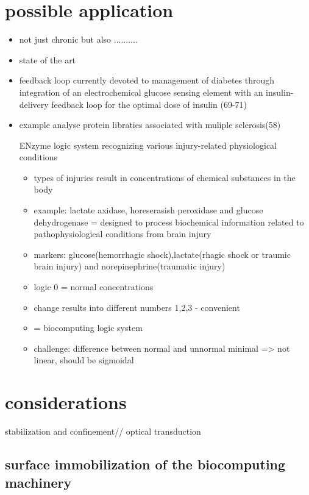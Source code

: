 \documentclass[runningheads]{llncs}
\begin{document}
\section{possible application}
	\begin{itemize}
		\item not just chronic but also ..........
		\item state of the art
		\item feedback loop currently devoted to management of diabetes through integration of an electrochemical glucose sensing element with an insulin-delivery feedback loop for the optimal dose of insulin (69-71)
		\item example analyse protein libraties associated with muliple sclerosis(58)
		
		ENzyme logic system recognizing various injury-related physiological conditions
		\begin{itemize}
			\item types of injuries result in concentrations of chemical substances in the body
			
			\item example: lactate axidase, horeserasish peroxidase and glucose dehydrogenase = designed to process biochemical information related to pathophysiological conditions from brain injury
			\item markers: glucose(hemorrhagic shock),lactate(rhagic shock or traumic brain injury) and norepinephrine(traumatic injury)
			\item logic 0 = normal concentrations
			\item change results into different numbers 1,2,3 - convenient
			\item = biocomputing logic system 
			\item challenge: difference between normal and unnormal minimal => not linear, should be sigmoidal	
		\end{itemize}
	\end{itemize}



\section{considerations}
stabilization and confinement//
optical transduction 
\subsection{surface immobilization of the biocomputing machinery}
	
\end{document}

